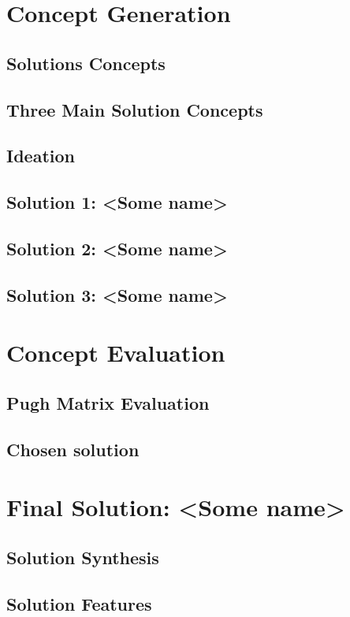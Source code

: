 \documentclass[12pt,oneside,letterpaper,english]{article}
\begin{document}
\section{Concept Generation}
\subsection{Solutions Concepts}
\subsection{Three Main Solution Concepts}
\subsection{Ideation}
\subsection{Solution 1: <Some name>}
\subsection{Solution 2: <Some name>}
\subsection{Solution 3: <Some name>}

\section{Concept Evaluation}
\subsection{Pugh Matrix Evaluation}
\subsection{Chosen solution}

\section{Final Solution: <Some name>}
\subsection{Solution Synthesis}
\subsection{Solution Features}
\end{document}
